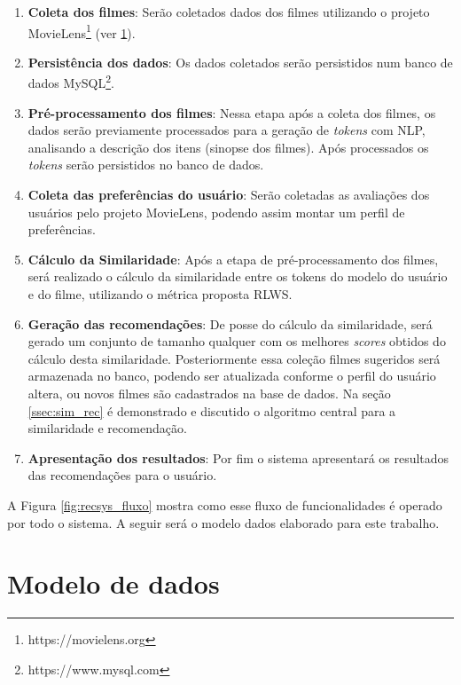 \begin{enumerate}
	\item{\textbf{Coleta dos filmes}: Serão coletados dados dos filmes utilizando o projeto MovieLens\footnote{https://movielens.org} (ver \ref{sec:dataModel}).}
	
	\item{\textbf{Persistência dos dados}: Os dados coletados serão persistidos num banco de dados MySQL\footnote{https://www.mysql.com}.}

	\item{\textbf{Pré-processamento dos filmes}: Nessa etapa após a coleta dos filmes, os dados serão previamente processados para a geração de \textit{tokens} com \ac{NLP}, analisando a descrição dos itens (sinopse dos filmes). Após processados os \textit{tokens} serão persistidos no banco de dados.}

	\item{\textbf{Coleta das preferências do usuário}: Serão coletadas as avaliações dos usuários pelo projeto MovieLens, podendo assim montar um perfil de preferências.}

	\item{\textbf{Cálculo da Similaridade}: Após a etapa de pré-processamento dos filmes, será realizado o cálculo da similaridade entre os tokens do modelo do usuário e do filme, utilizando o métrica proposta \ac{RLWS}.}

	\item{\textbf{Geração das recomendações}: De posse do cálculo da similaridade, será gerado um conjunto de tamanho qualquer com os melhores \textit{scores} obtidos do cálculo desta similaridade. Posteriormente essa coleção filmes sugeridos será armazenada no banco, podendo ser atualizada conforme o perfil do usuário altera, ou novos filmes são cadastrados na base de dados. Na seção \ref{ssec:sim_rec} é demonstrado e discutido o algoritmo central para a similaridade e recomendação.}

	\item{\textbf{Apresentação dos resultados}: Por fim o sistema apresentará os resultados das recomendações para o usuário.}
\end{enumerate}

A Figura \ref{fig:recsys_fluxo} mostra como esse fluxo de funcionalidades é operado por todo o sistema. A seguir será o modelo dados elaborado para este trabalho.

\section{Modelo de dados}
\label{sec:dataModel}

